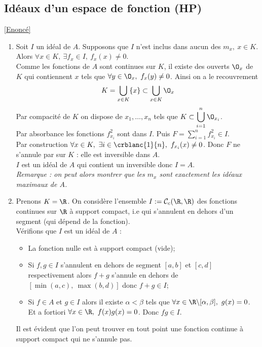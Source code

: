 \documentclass[8pt]{book}
\begin{document}
	\subsection{Idéaux d'un espace de  fonction  (HP)}
	\label{Idéaux d'un espace de fonction corrigé}
	\textcolor{blue}{\hyperref[Idéaux d'un espace de fonction]{[Enoncé]}}\\
	\begin{enumerate}[leftmargin=*]
		\item Soit $I$ un idéal de $A$. Supposons que $I$ n'est inclus dans aucun des $m_x,\ x\in K$. Alors $\forall x\in K,\ \exists f_x\in I,\ f_x(x)\ne 0$.\\
		Comme les fonctions de $A$ sont continues sur $K$, il existe des ouverts $\O_x$ de $K$ qui contiennent $x$ tels que $\forall y\in \O_x,\ f_x(y)\ne 0$. Ainsi on a le recouvrement
		$$K=\bigcup_{x\in K}\{x\}\subset \bigcup_{x\in K}\O_x$$
		Par compacité de $K$ on dispose de $x_1,\dots,x_n$ tels que $K\subset \displaystyle\bigcup_{i=1}^n\O_{x_i}$.\\
		Par absorbance les fonctions $f_{x_i}^2$ sont dans $I$. Puis $F=\displaystyle\sum_{i=1}^nf_{x_i}^2\in I$.\\
		Par construction $\forall x\in K,\ \exists i\in \crblanc{1}{n},\ f_{x_i}(x)\ne 0$. Donc $F$ ne s'annule par sur $K$ : elle est inversible dans $A$.\\
		$I$ est un idéal de $A$ qui contient un inversible donc $I=A$.\\
		\textit{Remarque : on peut alors montrer que les $m_x$ sont exactement les idéaux maximaux de $A$.}
		\item Prenons $K=\R$. On considère l'ensemble $I:=\mathcal C_c(\R,\R)$ des fonctions continues sur $\R$ à support compact, i.e qui s'annulent en dehors d'un segment (qui dépend de la fonction).\\
		Vérifions que $I$ est un idéal de $A$ :
		\begin{itemize}
			\item La fonction nulle est à support compact (vide);
			\item Si $f,g\in I$ s'annulent en dehors de segment $[a,b]$ et $[c,d]$ respectivement alors $f+g$ s'annule en dehors de $[\min(a,c),\ \max(b,d)]$ donc $f+g\in I$;
			\item Si $f\in A$ et $g\in I$ alors il existe $\alpha<\beta$ tels que $\forall x\in \R\backslash[\alpha,\beta],\ g(x)=0$.\\
			Et a fortiori $\forall x\in \R,\ f(x)g(x)=0$. Donc $fg\in I$.
		\end{itemize}
		Il est évident que l'on peut trouver en tout point une fonction continue à support compact qui ne s'annule pas.
	\end{enumerate}
	
\end{document}
